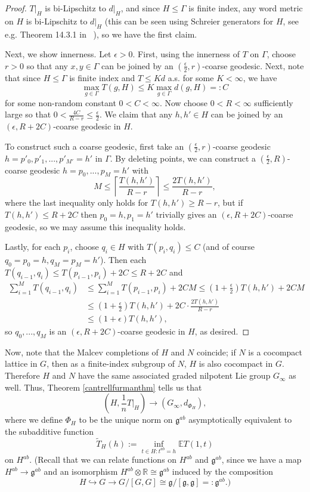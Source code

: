 \documentclass[12pt,reqno]{article}
\numberwithin{equation}{section}
\newcommand{\R}{\mathbb{R}}
\newcommand{\E}{\mathbb{E}}
\newcommand{\g}{\mathfrak{g}}
\begin{document}
\begin{proof}
$T|_H$ is bi-Lipschitz to $d|_H$, and since $H \le \Gamma$ is finite index, any word metric on $H$ is bi-Lipschitz to $d|_H$ (this can be
seen using Schreier generators for $H$, see e.g. Theorem 14.3.1 in ~\cite{KarMer}),
so we have the first claim.

Next, we show innerness. Let $\epsilon > 0$. First, using the innerness of $T$ on $\Gamma$, choose $r>0$ so that any $x,y \in \Gamma$
can be joined by an $(\frac{\epsilon}{2}, r)$-coarse geodesic. Next, note that since $H \le \Gamma$ is finite index and $T \le K d$ a.s. 
for some $K< \infty$, we have
\[
   \max_{g \in \Gamma} T(g,H) \le K \max_{g \in \Gamma} d(g,H) =: C
\]
for some non-random constant $0<C<\infty$.
Now choose $0<R<\infty$ sufficiently large so that $0 < \frac{4C}{R-r} \le \frac{\epsilon}{2}$. We claim that any $h, h' \in H$ can be joined
by an $(\epsilon, R + 2C)$-coarse geodesic in $H$.

To construct such a coarse geodesic, first take an $(\frac{\epsilon}{2}, r)$-coarse geodesic $h=p'_0,p'_1,...,p'_{M'}=h'$ in $\Gamma$.
By deleting points, we can construct a $(\frac{\epsilon}{2},R)$-coarse geodesic $h=p_0,...,p_M=h'$ with 
\[
   M \le \left\lceil \frac{ T(h,h') }{ R - r} \right\rceil \le \frac{ 2T(h,h') }{R-r},
\]
where the last inequality only holds for $T(h,h') \ge R-r$, but if $T(h,h') \le R + 2C$ then $p_0=h, p_1=h'$ trivially gives an 
$(\epsilon, R+2C)$-coarse geodesic, so we may assume this inequality holds.

Lastly, for each $p_i$, choose $q_i \in H$ with $T(p_i,q_i) \le C$ (and of course $q_0=p_0=h, q_M=p_M=h'$). Then
each $T(q_{i-1},q_i) \le T(p_{i-1},p_i) + 2C \le R + 2C$ and 
\begin{align*}
   \sum_{i=1}^M T(q_{i-1},q_i) &\le \sum_{i=1}^M T(p_{i-1},p_i) + 2CM \le (1+\frac{\epsilon}{2}) T(h,h') + 2CM \\
                                               &\le  (1 + \frac{\epsilon}{2})T(h,h') + 2C \cdot \frac{2 T(h,h')}{R - r} \\
                                               &\le (1 + \epsilon)T(h,h'),
\end{align*}
so $q_0,...,q_M$ is an $(\epsilon,R+2C)$-coarse geodesic in $H$, as desired.
\end{proof}

Now, note that the Malcev completions of $H$ and $N$ coincide; if $N$ is a cocompact lattice in $G$, then as a finite-index subgroup of $N$,
$H$ is also cocompact in $G$. Therefore $H$ and $N$ have the same associated graded nilpotent Lie group $G_{\infty}$ as well.
Thus, Theorem \ref{cantrellfurmanthm} tells us that
\[
   (H, \frac{1}{n} T|_H) \to (G_{\infty}, d_{\Phi_H}),
\]
where we define $\Phi_H$ to be the unique norm on $\g^{ab}$ asymptotically equivalent to the subadditive function
\[
   \tilde{T}_H (h) := \inf_{t \in H : t^{ab} = h} \E T(1,t)
\]
on $H^{ab}$. (Recall that we can relate functions on $H^{ab}$ and $\g^{ab}$, since we have
a map $H^{ab} \to \g^{ab}$ and an isomorphism $H^{ab} \otimes \R \cong \g^{ab}$ induced by the composition
\[
   H \hookrightarrow{} G \to G/[G,G] \cong \g/[\g,\g] =: \g^{ab}.)
\]
\end{document}
